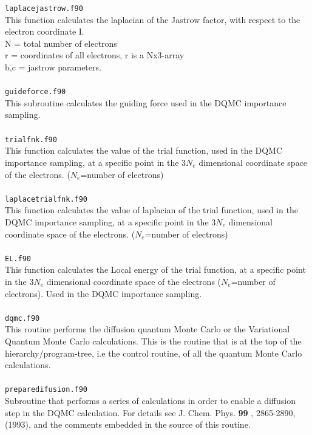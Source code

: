 \documentclass[a4paper,twoside,openany]{book}
\begin{document}
{{\texttt{laplacejastrow.f90}\\
This function calculates the laplacian of the Jastrow factor,
with respect to the electron coordinate I.\\
N = total number of electrons \\
r = coordinates of all electrons, r is a Nx3-array \\
b,c = jastrow parameters. \\ \\
\texttt{guideforce.f90}\\
This subroutine calculates the guiding force used in the
DQMC importance sampling.  \\ \\
\texttt{trialfnk.f90}\\
This function calculates the value of the trial function, used in the
DQMC importance sampling,  at a specific point in the $3N_{e}$ dimensional coordinate space of the electrons. ($N_{e}$=number of electrons) \\ \\  
\texttt{laplacetrialfnk.f90}\\
This function calculates the value of laplacian of the trial function, used in the
DQMC importance sampling,  at a specific point in the $3N_{e}$ dimensional coordinate space of the electrons. ($N_{e}$=number of electrons) \\ \\  
\texttt{EL.f90}\\
This function calculates the Local energy  of the trial function, at a specific point in the $3N_{e}$ dimensional coordinate space of the electrons ($N_{e}$=number of electrons).
 Used in the DQMC importance sampling. \\ \\
 \texttt{dqmc.f90}\\
 This routine performs the diffusion quantum Monte Carlo or the  Variational Quantum Monte Carlo calculations. This is the routine that is at the top of the hierarchy/program-tree, i.e the 
 control routine, of all the quantum Monte Carlo  calculations. \\ \\
 \texttt{preparedifusion.f90}\\
 Subroutine that performs a series of calculations in order to enable a diffusion step in the DQMC calculation. For details see J. Chem. Phys. {\bf 99} , 2865-2890, (1993), and the comments embedded in  the 
 source of this routine. \\ \\
}}
\end{document}
